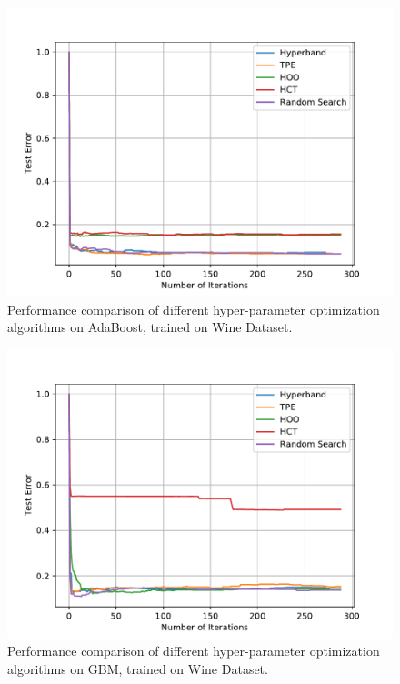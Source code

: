 \documentclass[runningheads,a4paper]{llncs}
\begin{document}
\begin{figure}[ht]
    \centering
    \includegraphics[scale=0.8]{img/uci/ada_0.pdf}
    \caption{Performance comparison of different hyper-parameter optimization algorithms on AdaBoost, trained on Wine Dataset.}
    \label{ada_0}
\end{figure}

\begin{figure}[ht]
    \centering
    \includegraphics[scale=0.8]{img/uci/gbm_0.pdf}
    \caption{Performance comparison of different hyper-parameter optimization algorithms on GBM, trained on Wine Dataset.}
    \label{gbm_0}
\end{figure}
\end{document}
